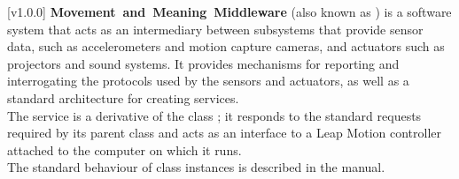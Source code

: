 [v1.0.0]
\textbf{Movement~and~Meaning~Middleware} (also known as \mplusm{}) is a software system
that acts as an intermediary between subsystems that provide sensor data, such as
accelerometers and motion capture cameras, and actuators such as projectors and sound
systems.
It provides mechanisms for reporting and interrogating the protocols used by the sensors
and actuators, as well as a standard architecture for creating services.\\

The \LMI{} service is a derivative of the \mplusm{} class ;
it responds to the standard requests required by its parent class and acts as an interface
to a Leap Motion controller attached to the computer on which it runs.\\

The standard behaviour of  class instances is described in
the \emph{\MMM} manual.
\primaryEnd{}
